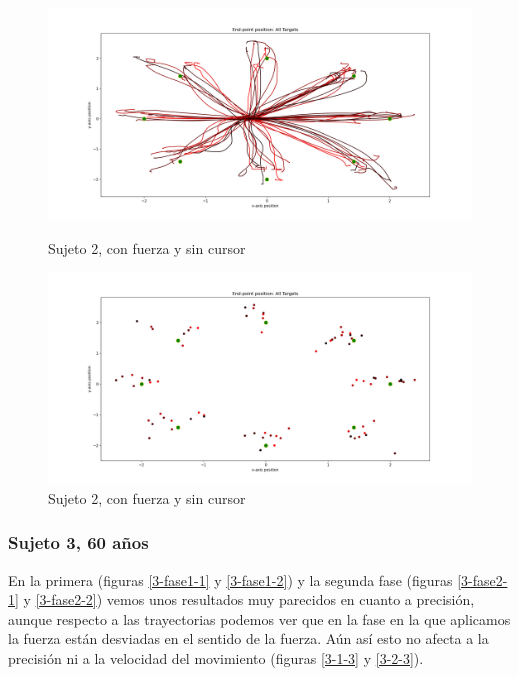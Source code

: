 \documentclass[a4paper,11pt, oneside]{book}
\begin{document}
\begin{figure}[H]
	\begin{minipage}[b]{0.5\linewidth}
		\centering
		\includegraphics[width=\linewidth]{sujeto2/force_no_cursor/trayectorias}
		\caption{Sujeto 2, con fuerza y sin cursor}
		\label{2-fase4-1}
	\end{minipage}
	\hspace{0.5cm}
	\begin{minipage}[b]{0.5\linewidth}
		\centering
		\includegraphics[width=\linewidth]{sujeto2/force_no_cursor/trayectorias_puntos}
		\caption{Sujeto 2, con fuerza y sin cursor}
		\label{2-fase4-2}
	\end{minipage}
\end{figure}

\subsubsection{Sujeto 3, 60 años}

En la primera (figuras \ref{3-fase1-1} y \ref{3-fase1-2}) y la segunda fase (figuras \ref{3-fase2-1} y \ref{3-fase2-2}) vemos unos resultados muy parecidos en cuanto a precisión, aunque respecto a las trayectorias podemos ver que en la fase en la que aplicamos la fuerza están desviadas en el sentido de la fuerza. Aún así esto no afecta a la precisión ni a la velocidad del movimiento (figuras \ref{3-1-3} y \ref{3-2-3}).
\end{document}
